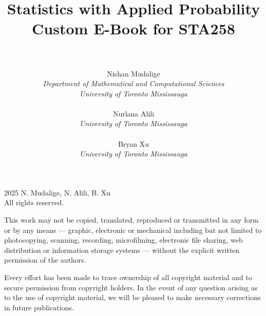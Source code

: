 \documentclass[oneside]{book}
\theoremstyle{pdf}
\theoremstyle{definition}
\theoremstyle{defin}
\begin{document}





\title{\bf Statistics with Applied Probability\\
Custom E-Book for STA258\\
\hfill\\}

\author{
Nishan Mudalige\\
{\it Department of Mathematical and Computational Sciences} \\
{\it University of Toronto Mississauga}\\[0.5em]
\ \\
Nurlana Alili\\
{\it University of Toronto Mississauga}\\[0.5em]
\ \\
Bryan Xu\\
{\it University of Toronto Mississauga}
}
\date{}


\maketitle


\newpage
\thispagestyle{empty}

%

\newpage
\large





\begingroup
\small
\parindent 0pt
\parskip \baselineskip
\textcopyright{} 2025 N. Mudalige, N. Alili, B. Xu \\
All rights reserved.

This work may not be copied, translated, reproduced or transmitted
in any form or by any means --- graphic, electronic or mechanical including but not
limited to photocopying, scanning, recording, microfilming, electronic file sharing,
web distribution or information storage systems --- without the explicit 
written permission of the authors. 

Every effort has been made to trace ownership of all copyright material
and to secure permission from copyright holders.
In the event of any question arising as to the use of copyright material, we will be pleased
to make necessary corrections in future publications.

%
\end{document}
